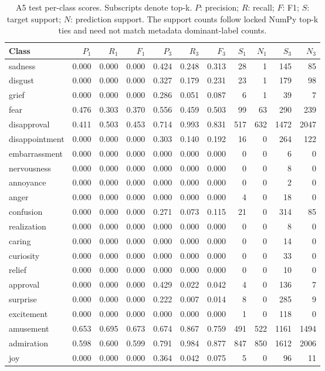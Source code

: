 \begin{table}[!htbp]
\centering
\scriptsize
\setlength{\tabcolsep}{5pt}
\begin{tabular}{lrrrrrrrrrr}
\toprule
Class & $P_1$ & $R_1$ & $F_1$ & $P_3$ & $R_3$ & $F_3$ & $S_1$ & $N_1$ & $S_3$ & $N_3$ \\
\midrule
sadness & 0.000 & 0.000 & 0.000 & 0.424 & 0.248 & 0.313 & 28 & 1 & 145 & 85 \\
disgust & 0.000 & 0.000 & 0.000 & 0.327 & 0.179 & 0.231 & 23 & 1 & 179 & 98 \\
grief & 0.000 & 0.000 & 0.000 & 0.286 & 0.051 & 0.087 & 6 & 1 & 39 & 7 \\
fear & 0.476 & 0.303 & 0.370 & 0.556 & 0.459 & 0.503 & 99 & 63 & 290 & 239 \\
disapproval & 0.411 & 0.503 & 0.453 & 0.714 & 0.993 & 0.831 & 517 & 632 & 1472 & 2047 \\
disappointment & 0.000 & 0.000 & 0.000 & 0.303 & 0.140 & 0.192 & 16 & 0 & 264 & 122 \\
embarrassment & 0.000 & 0.000 & 0.000 & 0.000 & 0.000 & 0.000 & 0 & 0 & 6 & 0 \\
nervousness & 0.000 & 0.000 & 0.000 & 0.000 & 0.000 & 0.000 & 0 & 0 & 8 & 0 \\
annoyance & 0.000 & 0.000 & 0.000 & 0.000 & 0.000 & 0.000 & 0 & 0 & 2 & 0 \\
anger & 0.000 & 0.000 & 0.000 & 0.000 & 0.000 & 0.000 & 4 & 0 & 18 & 0 \\
confusion & 0.000 & 0.000 & 0.000 & 0.271 & 0.073 & 0.115 & 21 & 0 & 314 & 85 \\
realization & 0.000 & 0.000 & 0.000 & 0.000 & 0.000 & 0.000 & 0 & 0 & 8 & 0 \\
caring & 0.000 & 0.000 & 0.000 & 0.000 & 0.000 & 0.000 & 0 & 0 & 14 & 0 \\
curiosity & 0.000 & 0.000 & 0.000 & 0.000 & 0.000 & 0.000 & 0 & 0 & 33 & 0 \\
relief & 0.000 & 0.000 & 0.000 & 0.000 & 0.000 & 0.000 & 0 & 0 & 10 & 0 \\
approval & 0.000 & 0.000 & 0.000 & 0.429 & 0.022 & 0.042 & 4 & 0 & 136 & 7 \\
surprise & 0.000 & 0.000 & 0.000 & 0.222 & 0.007 & 0.014 & 8 & 0 & 285 & 9 \\
excitement & 0.000 & 0.000 & 0.000 & 0.000 & 0.000 & 0.000 & 1 & 0 & 118 & 0 \\
amusement & 0.653 & 0.695 & 0.673 & 0.674 & 0.867 & 0.759 & 491 & 522 & 1161 & 1494 \\
admiration & 0.598 & 0.600 & 0.599 & 0.791 & 0.984 & 0.877 & 847 & 850 & 1612 & 2006 \\
joy & 0.000 & 0.000 & 0.000 & 0.364 & 0.042 & 0.075 & 5 & 0 & 96 & 11 \\
\bottomrule
\end{tabular}
\caption{A5 test per-class scores. Subscripts denote top-k. $P$: precision; $R$: recall; $F$: F1; $S$: target support; $N$: prediction support. The support counts follow locked NumPy top-k ties and need not match metadata dominant-label counts.}
\label{tab:classes-a5_distribution}
\end{table}
